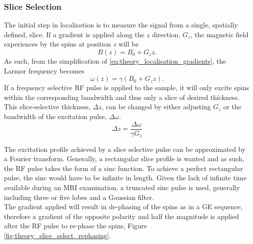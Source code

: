 \subsubsection{Slice Selection}
The initial step in localisation is to measure the signal from a single, spatially defined, slice. If a gradient is applied along the $z$ direction, $G_z$, the magnetic field experiences by the spins at position $z$ will be
\begin{equation}
B\left( z\right)  = B_0 + G_zz.
\end{equation}
As such, from the simplification of \eqref{eq:theory_localisation_gradients}, the Larmor frequency becomes
\begin{equation}
\omega\left( z\right)  = \gamma\left( B_0 + G_zz\right).
\end{equation}
If a frequency selective \ac{RF} pulse is applied to the sample, it will only excite spins within the corresponding bandwidth and thus only a slice of desired thickness. This slice-selective thickness, $\Delta z$, can be changed by either adjusting $G_z$ or the bandwidth of the excitation pulse, $\Delta \omega$.
\begin{equation}
\Delta z = \frac{\Delta \omega}{\gamma G_z}
\end{equation}

The excitation profile achieved by a slice selective pulse can be approximated by a Fourier transform. Generally, a rectangular slice profile is wanted and as such, the \ac{RF} pulse takes the form of a sinc function. To achieve a perfect rectangular pulse, the sinc would have to be infinite in length. Given the lack of infinite time available during an \ac{MRI} examination, a truncated sinc pulse is used, generally including three or five lobes and a Gaussian filter.\\

The gradient applied will result in de-phasing of the spins as in a \ac{GE} sequence, therefore a gradient of the opposite polarity and half the magnitude is applied after the \ac{RF} pulse to re-phase the spins, Figure \ref{fig:theory_slice_select_rephasing}.

